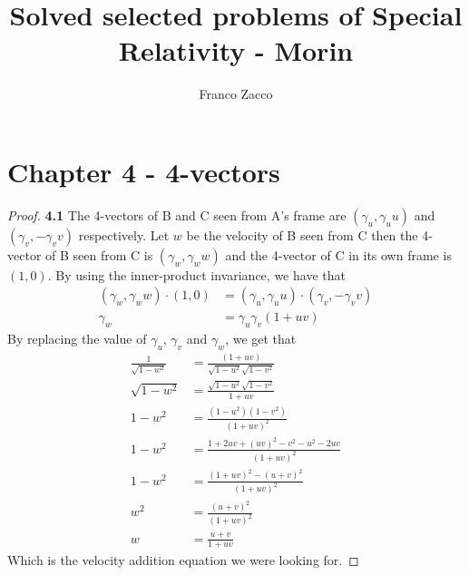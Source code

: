 \documentclass[11pt]{article}
\title{\textbf{Solved selected problems of Special Relativity - Morin}}
\author{Franco Zacco}
\date{}
\theoremstyle{definition}
\begin{document}
\maketitle
\thispagestyle{empty}

\section*{Chapter 4 - 4-vectors}

\begin{proof}{\textbf{4.1}}
    The 4-vectors of B and C seen from A's frame are $(\gamma_u, \gamma_u u)$
    and $(\gamma_v, -\gamma_v v)$ respectively.
    Let $w$ be the velocity of B seen from C then the 4-vector of B seen from C
    is $(\gamma_w, \gamma_w w)$ and the 4-vector of C in its own frame is
    $(1, 0)$. By using the inner-product invariance, we have that
    \begin{align*}
        (\gamma_w, \gamma_w w)\cdot(1, 0) &=
        (\gamma_u, \gamma_u u)\cdot(\gamma_v, -\gamma_v v)\\
        \gamma_w &= \gamma_u\gamma_v(1 + uv)
    \end{align*}
    By replacing the value of $\gamma_u$, $\gamma_v$ and $\gamma_w$,
    we get that
    \begin{align*}
        \frac{1}{\sqrt{1 - w^2}} &= \frac{(1 + uv)}{\sqrt{1 - u^2}\sqrt{1 - v^2}}\\
        \sqrt{1 - w^2} &= \frac{\sqrt{1 - u^2}\sqrt{1 - v^2}}{1 + uv}\\
        1 - w^2 &= \frac{(1 - u^2)(1 - v^2)}{(1 + uv)^2}\\
        1 - w^2 &= \frac{1 + 2uv + (uv)^2 - v^2 - u^2 -2uv}{(1 + uv)^2}\\
        1 - w^2 &= \frac{(1 + uv)^2 - (u +v)^2}{(1 + uv)^2}\\
        w^2 &= \frac{(u +v)^2}{(1 + uv)^2}\\
        w &= \frac{u +v}{1 + uv}
    \end{align*}
    Which is the velocity addition equation we were looking for.
\end{proof}
\cleardoublepage
\end{document}
